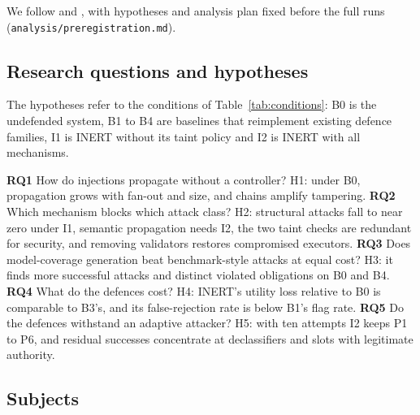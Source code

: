 \documentclass[pdflatex,sn-mathphys-num]{sn-jnl}
\theoremstyle{thmstyleone}%
\theoremstyle{thmstyletwo}%
\theoremstyle{thmstylethree}%
\begin{document}
We follow \citet{wohlin2012experimentation} and \citet{arcuri2011practical}, with hypotheses and analysis plan fixed before the full runs (\texttt{analysis/preregistration.md}).

\subsection{Research questions and hypotheses}

The hypotheses refer to the conditions of Table~\ref{tab:conditions}: B0 is the undefended system, B1 to B4 are baselines that reimplement existing defence families, I1 is INERT without its taint policy and I2 is INERT with all mechanisms.

\textbf{RQ1} How do injections propagate without a controller? H1: under B0, propagation grows with fan-out and size, and chains amplify tampering. \textbf{RQ2} Which mechanism blocks which attack class? H2: structural attacks fall to near zero under I1, semantic propagation needs I2, the two taint checks are redundant for security, and removing validators restores compromised executors. \textbf{RQ3} Does model-coverage generation beat benchmark-style attacks at equal cost? H3: it finds more successful attacks and distinct violated obligations on B0 and B4. \textbf{RQ4} What do the defences cost? H4: INERT's utility loss relative to B0 is comparable to B3's, and its false-rejection rate is below B1's flag rate. \textbf{RQ5} Do the defences withstand an adaptive attacker? H5: with ten attempts I2 keeps P1 to P6, and residual successes concentrate at declassifiers and slots with legitimate authority.

\subsection{Subjects}
\end{document}
